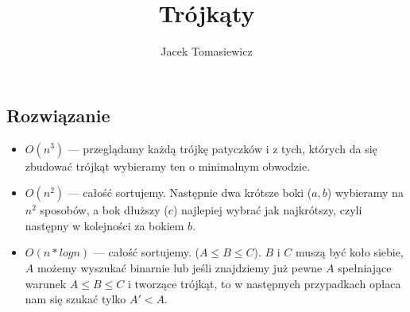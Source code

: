 \documentclass[opr,utf8]{sinol}
\title{Trójkąty}
\author{Jacek Tomasiewicz}
\begin{document}
  \begin{tasktext}%
    \section{Rozwiązanie}
      
	\begin{itemize}
	\item
	$O(n^3)$ --- przeglądamy każdą trójkę patyczków i z tych, których da się 
	zbudować trójkąt wybieramy ten o minimalnym obwodzie.

	\item
	$O(n^2)$ --- całość sortujemy. Następnie dwa krótsze boki ($a, b$) wybieramy 
	na $n^2$ sposobów, a bok dłuższy ($c$) najlepiej wybrać jak najkrótszy, 
	czyli następny w kolejności za bokiem $b$.

	\item
	$O(n*log n)$ --- całość sortujemy. ($A \leq B \leq C$). $B$ i $C$ muszą 
	być koło siebie, $A$ możemy wyszukać binarnie lub jeśli znajdziemy już 
	pewne $A$ spełniające warunek $A \leq B \leq C$ i tworzące trójkąt, to 
	w następnych przypadkach opłaca nam się szukać tylko $A'< A$. 

	\end{itemize}

  \end{tasktext}
\end{document}
